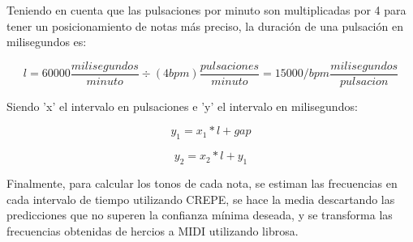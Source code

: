 Teniendo en cuenta que las pulsaciones por minuto son multiplicadas por 4 para tener un posicionamiento de notas más preciso, la duración de una pulsación en milisegundos es:

\begin{displaymath}
	l = 60000 \frac{milisegundos}{minuto} \div (4bpm)\frac{pulsaciones}{minuto} = 15000 / bpm\frac{milisegundos}{pulsacion}
\end{displaymath}

Siendo 'x' el intervalo en pulsaciones e 'y' el intervalo en milisegundos:

\begin{displaymath}
	y_1 =  x_1 * l + gap
\end{displaymath}

\begin{displaymath}
	y_2 = x_2 * l + y_1
\end{displaymath}

Finalmente, para calcular los tonos de cada nota, se estiman las frecuencias en cada intervalo de tiempo utilizando CREPE, se hace la media descartando las predicciones que no superen la confianza mínima deseada, y se transforma las frecuencias obtenidas de hercios a MIDI utilizando librosa.
